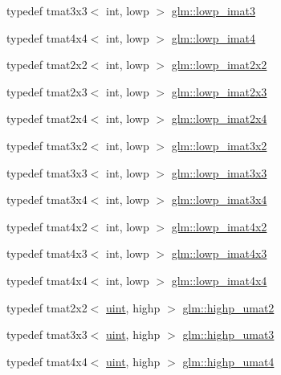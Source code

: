 \begin{DoxyCompactItemize}
\item 
typedef tmat3x3$<$ int, lowp $>$ \hyperlink{group__gtc__matrix__integer_ga2f7d17630aa9e27bb9e62f98603a4d7e}{glm\+::lowp\+\_\+imat3}
\item 
typedef tmat4x4$<$ int, lowp $>$ \hyperlink{group__gtc__matrix__integer_gad9a60f2ee78750d31b129c01096751b6}{glm\+::lowp\+\_\+imat4}
\item 
typedef tmat2x2$<$ int, lowp $>$ \hyperlink{group__gtc__matrix__integer_gad1950bd75bc033e8511cec3deb15af56}{glm\+::lowp\+\_\+imat2x2}
\item 
typedef tmat2x3$<$ int, lowp $>$ \hyperlink{group__gtc__matrix__integer_ga00e00501dd9bf929e1dca7a167ba526b}{glm\+::lowp\+\_\+imat2x3}
\item 
typedef tmat2x4$<$ int, lowp $>$ \hyperlink{group__gtc__matrix__integer_gaf664d339f1b66e62ed07c913e60be940}{glm\+::lowp\+\_\+imat2x4}
\item 
typedef tmat3x2$<$ int, lowp $>$ \hyperlink{group__gtc__matrix__integer_ga93514d2df726334e6d5edd373635d343}{glm\+::lowp\+\_\+imat3x2}
\item 
typedef tmat3x3$<$ int, lowp $>$ \hyperlink{group__gtc__matrix__integer_ga434abdeee9a8908660691be659f6693f}{glm\+::lowp\+\_\+imat3x3}
\item 
typedef tmat3x4$<$ int, lowp $>$ \hyperlink{group__gtc__matrix__integer_ga61fe3487c1f4f10fb0f5c9fa0873a694}{glm\+::lowp\+\_\+imat3x4}
\item 
typedef tmat4x2$<$ int, lowp $>$ \hyperlink{group__gtc__matrix__integer_ga87e2118b22cbc6916805aafcda52a943}{glm\+::lowp\+\_\+imat4x2}
\item 
typedef tmat4x3$<$ int, lowp $>$ \hyperlink{group__gtc__matrix__integer_ga76c201715b216ddd5d7de3c3759211f1}{glm\+::lowp\+\_\+imat4x3}
\item 
typedef tmat4x4$<$ int, lowp $>$ \hyperlink{group__gtc__matrix__integer_ga46f8dc46c3dcde8fa2e8b8f645c0d9ef}{glm\+::lowp\+\_\+imat4x4}
\item 
typedef tmat2x2$<$ \hyperlink{stb__image_8c_a91ad9478d81a7aaf2593e8d9c3d06a14}{uint}, highp $>$ \hyperlink{group__gtc__matrix__integer_ga113fe97aa8688eaa287a02f8362f3e47}{glm\+::highp\+\_\+umat2}
\item 
typedef tmat3x3$<$ \hyperlink{stb__image_8c_a91ad9478d81a7aaf2593e8d9c3d06a14}{uint}, highp $>$ \hyperlink{group__gtc__matrix__integer_ga58bc8d0aeac88af0d38723b5cfa4fa67}{glm\+::highp\+\_\+umat3}
\item 
typedef tmat4x4$<$ \hyperlink{stb__image_8c_a91ad9478d81a7aaf2593e8d9c3d06a14}{uint}, highp $>$ \hyperlink{group__gtc__matrix__integer_ga7b0e78c54432c7236d8b96473b7423ec}{glm\+::highp\+\_\+umat4}

\end{DoxyCompactItemize}
